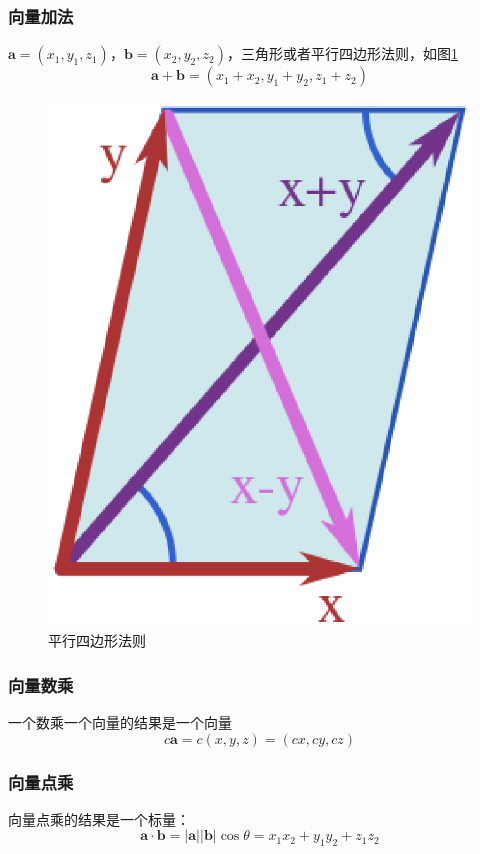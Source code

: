 \documentclass[a4paper,oneside,11pt]{article}
\newcommand{\bol}[1]{\textbf{#1}}
\begin{document}
\subsubsection{向量加法}
$\bol{a} = (x_1, y_1, z_1)$，$\bol{b} = (x_2, y_2, z_2)$，三角形或者平行四边形法则，如图\ref{fig1}
\begin{displaymath}
\bol{a} + \bol{b} = (x_1 + x_2, y_1 + y_2, z_1 + z_2)
\end{displaymath}
\vspace{-8mm}
\begin{figure}[!h]
\centering
\includegraphics[scale=0.4]{./figure/fig1.eps}
\caption{\label{fig1}平行四边形法则}
\end{figure}
\subsubsection{向量数乘}
一个数乘一个向量的结果是一个向量
\begin{displaymath}
c\bol{a} = c(x, y, z) = (cx, cy, cz)
\end{displaymath}
\subsubsection{向量点乘}
向量点乘的结果是一个标量：
\begin{displaymath}
\bol{a} \cdot \bol{b} = \vert \bol{a}\vert \vert\bol{b}\vert \cos\theta =x_1x_2 + y_1y_2 + z_1z_2
\end{displaymath}
\end{document}
